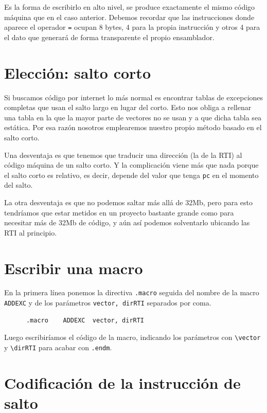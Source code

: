 Es la forma de escribirlo en alto nivel, se produce exactamente el mismo código
máquina que en el caso anterior. Debemos recordar que las instrucciones donde
aparece el operador {\tt =} ocupan 8 bytes, 4 para la propia instrucción y otros
4 para el dato que generará de forma transparente el propio ensamblador.

\section{Elección: salto corto}

Si buscamos código por internet lo más normal es encontrar tablas de excepciones
completas que usan el salto largo en lugar del corto. Esto nos obliga a
rellenar una tabla en la que la mayor parte de vectores no se usan y a que
dicha tabla sea estática. Por esa razón nosotros emplearemos nuestro propio
método basado en el salto corto.

Una desventaja es que tenemos que traducir una dirección (la de la RTI) al
código máquina de un salto corto. Y la complicación viene más que nada porque
el salto corto es relativo, es decir, depende del valor que tenga {\tt pc} en
el momento del salto.

La otra desventaja es que no podemos saltar más allá de 32Mb, pero para esto tendríamos
que estar metidos en un proyecto bastante grande como para necesitar más de 32Mb
de código, y aún así podemos solventarlo ubicando las RTI al principio.

\section{Escribir una macro}

En la primera línea ponemos la directiva {\tt .macro} seguida del nombre de la macro
{\tt ADDEXC} y de los parámetros {\tt vector, dirRTI} separados por coma.

\begin{lstlisting}
      .macro    ADDEXC  vector, dirRTI
\end{lstlisting}

Luego escribiríamos el código de la macro, indicando los parámetros con
{\tt \textbackslash vector} y {\tt \textbackslash dirRTI} para acabar con {\tt .endm}.

\section{Codificación de la instrucción de salto}

